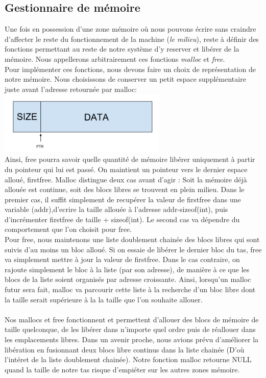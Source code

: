 \documentclass[frenchb]{article}
\begin{document}
\subsection{Gestionnaire de mémoire}
Une fois en possession d'une zone mémoire où nous pouvons écrire sans craindre d'affecter le reste du fonctionnement de la machine (\textit{le milieu}), reste à définir des fonctions permettant au reste de notre système d'y reserver et libérer de la mémoire. Nous appellerons arbitrairement ces fonctions \textit{malloc} et \textit{free}.\\
Pour implémenter ces fonctions, nous devons faire un choix de représentation de notre mémoire. Nous choisissons de conserver un petit espace supplémentaire juste avant l'adresse retournée par malloc:\\
\includegraphics[width=8cm]{memblock.png}\\
Ainsi, free pourra savoir quelle quantité de mémoire libérer uniquement à partir du pointeur qui lui est passé. On maintient un pointeur vers le dernier espace alloué, \textsf{firstfree}. Malloc distingue deux cas avant d'agir : Soit la mémoire déjà allouée est continue, soit des blocs libres se trouvent en plein milieu. Dans le premier cas, il suffit simplement de recupérer la valeur de \textsf{firstfree} dans une variable (\textsf{addr}),d'ecrire la taille allouée à l'adresse \textsf{addr-sizeof(int)}, puis d'incrémenter \textsf{firstfree} de \textsf{taille + sizeof(int)}. Le second cas va dépendre du comportement que l'on choisit pour free.\\
Pour free, nous maintenons une liste doublement chainée des blocs libres qui sont suivis d'au moins un bloc alloué. Si on essaie de libérer le dernier bloc du tas, free va simplement mettre à jour la valeur de \textsf{firstfree}. Dans le cas contraire, on rajoute simplement le bloc à la liste (par son adresse), de manière à ce que les blocs de la liste soient organisés par adresse croissante. Ainsi, lorsqu'un malloc futur sera fait, malloc va parcourir cette liste à la recherche d'un bloc libre dont la taille serait supérieure à la la taille que l'on souhaite allouer. \\\\
Nos mallocs et free fonctionnent et permettent d'allouer des blocs de mémoire de taille quelconque, de les libérer dans n'importe quel ordre puis de réallouer dans les emplacements libres. Dans un avenir proche, nous avions prévu d'améliorer la libération en fusionnant deux blocs libre continus dans la liste chainée (D'où l'intéret de la liste doublement chainée). Notre fonction malloc retourne \textsf{NULL} quand la taille de notre tas risque d'empiéter sur les autres zones mémoire. 
\end{document}
